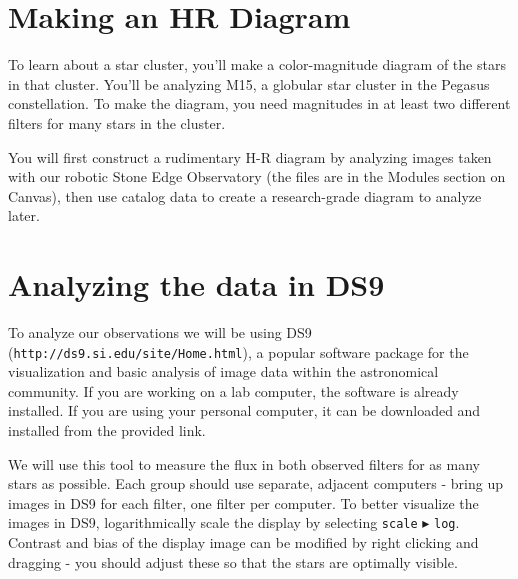 \section{Making an HR Diagram}

To learn about a star cluster, you'll make a color-magnitude diagram of the stars in that cluster. You'll be analyzing M15, a globular star cluster in the Pegasus constellation. To make the diagram, you need magnitudes in at least two different filters for many stars in the cluster.

You will first construct a rudimentary H-R diagram by analyzing images taken with our robotic Stone Edge Observatory (the files are in the Modules section on Canvas), then use catalog data to create a research-grade diagram to analyze later.


\section{Analyzing the data in DS9}

To analyze our observations we will be using DS9 (\texttt{http://ds9.si.edu/site/Home.html}), a popular software package for the visualization and basic analysis of image data within the astronomical community. If you are working on a lab computer, the software is already installed. If you are using your personal computer, it can be downloaded and installed from the provided link. 

We will use this tool to measure the flux in both observed filters for as many stars as possible. Each group should use separate, adjacent computers - bring up images in DS9 for each filter, one filter per computer. To better visualize the images in DS9, logarithmically scale the display by selecting \texttt{scale} $\blacktriangleright$ \texttt{log}. Contrast and bias of the display image can be modified by right clicking and dragging - you should adjust these so that the stars are optimally visible.

